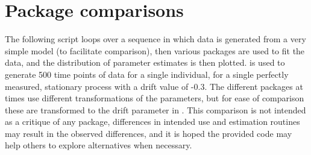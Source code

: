 \documentclass[nojss]{jss}\usepackage[]{graphicx}\usepackage[]{color}
\begin{document}
\section{Package comparisons} \label{app:appendixA}\nopagebreak
The following script loops over a sequence in which data is generated from a very simple model (to facilitate comparison), then various packages are used to fit the data, and the distribution of parameter estimates is then plotted.  is used to generate 500 time points of data for a single individual, for a single perfectly measured, stationary process with a drift value of -0.3. The different packages at times use different transformations of the parameters, but for ease of comparison these are transformed to the drift parameter in . This comparison is not intended as a critique of any package, differences in intended use and estimation routines may result in the observed differences, and it is hoped the provided code  may help others to explore alternatives when necessary.
\end{document}
